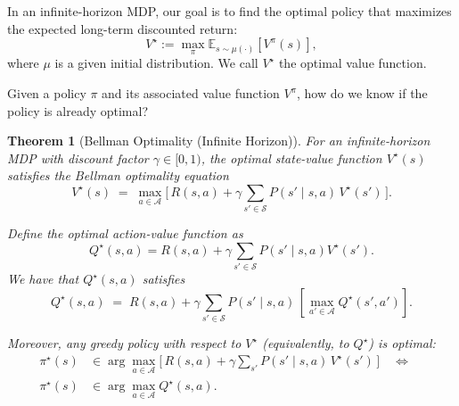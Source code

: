 \documentclass[
]{book}
\newtheorem{theorem}{Theorem}[chapter]
\theoremstyle{definition}
\theoremstyle{definition}
\theoremstyle{definition}
\theoremstyle{definition}
\theoremstyle{remark}
\begin{document}
In an infinite-horizon MDP, our goal is to find the optimal policy that maximizes the expected long-term discounted return:
\[
V^\star := \max_{\pi} \mathbb{E}_{s \sim \mu(\cdot)} [V^\pi(s)],
\]
where \(\mu\) is a given initial distribution. We call \(V^\star\) the optimal value function.

Given a policy \(\pi\) and its associated value function \(V^\pi\), how do we know if the policy is already optimal?

\begin{theorem}[Bellman Optimality (Infinite Horizon)]
\protect\hypertarget{thm:BellmanOptimalityInfiniteHorizon}{}\label{thm:BellmanOptimalityInfiniteHorizon}For an infinite-horizon MDP with discount factor \(\gamma \in [0,1)\),
the optimal state-value function \(V^\star(s)\)
satisfies the Bellman optimality equation
\begin{equation}
V^\star(s) \;=\; \max_{a \in \mathcal{A}}
\Big[\, R(s,a) + \gamma \sum_{s' \in \mathcal{S}} P(s' \mid s,a)\, V^\star(s') \,\Big].
\label{eq:BellmanOptimalityInfiniteHorizonStateValue}
\end{equation}

Define the optimal action-value function as
\begin{equation}
Q^\star(s,a) = R(s,a) + \gamma \sum_{s' \in \mathcal{S}} P(s' \mid s, a) V^\star(s').
\label{eq:InfiniteHorizonOptimalActionValue}
\end{equation}
We have that \(Q^\star(s,a)\) satisfies
\begin{equation}
Q^\star(s,a) \;=\; R(s,a) + \gamma \sum_{s' \in \mathcal{S}} P(s' \mid s,a)\, \left[\max_{a' \in \mathcal{A}} Q^\star(s',a') \right].
\label{eq:BellmanOptimalityInfiniteHorizonActionValue}
\end{equation}

Moreover, any greedy policy with respect to \(V^\star\) (equivalently, to \(Q^\star\)) is optimal:
\begin{equation}
\begin{split}
\pi^\star(s) & \in \arg\max_{a \in \mathcal{A}}
\Big[\, R(s,a) + \gamma \sum_{s'} P(s' \mid s,a)\, V^\star(s') \,\Big]
\quad\Longleftrightarrow\quad \\
\pi^\star(s) & \in \arg\max_{a \in \mathcal{A}} Q^\star(s,a).
\end{split}
\label{eq:InfiniteHorizonOptimalPolicy}
\end{equation}
\end{theorem}
\end{document}
